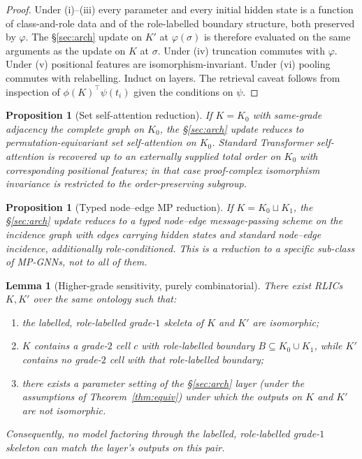 \documentclass[11pt]{article}
\theoremstyle{definition}
\theoremstyle{plain}
\newtheorem{lemma}[definition]{Lemma}
\newtheorem{proposition}[definition]{Proposition}
\begin{document}
\begin{proof}
Under (i)--(iii) every parameter and every initial hidden state is a function of class-and-role data and of the role-labelled boundary structure, both preserved by $\varphi$. The \S\ref{sec:arch} update on $K'$ at $\varphi(\sigma)$ is therefore evaluated on the same arguments as the update on $K$ at $\sigma$. Under (iv) truncation commutes with $\varphi$. Under (v) positional features are isomorphism-invariant. Under (vi) pooling commutes with relabelling. Induct on layers. The retrieval caveat follows from inspection of $\phi(K)^\top \psi(t_i)$ given the conditions on $\psi$.
\end{proof}

\begin{proposition}[Set self-attention reduction]\label{prop:set}
If $K = K_0$ with same-grade adjacency the complete graph on $K_0$, the \S\ref{sec:arch} update reduces to permutation-equivariant set self-attention on $K_0$. Standard Transformer self-attention is recovered up to an \emph{externally supplied} total order on $K_0$ with corresponding positional features; in that case proof-complex isomorphism invariance is restricted to the order-preserving subgroup.
\end{proposition}

\begin{proposition}[Typed node--edge MP reduction]\label{prop:nodeedge}
If $K = K_0 \sqcup K_1$, the \S\ref{sec:arch} update reduces to a typed node--edge message-passing scheme on the incidence graph with edges carrying hidden states and standard node--edge incidence, additionally role-conditioned. This is a reduction to a specific sub-class of MP-GNNs, not to all of them.
\end{proposition}

\begin{lemma}[Higher-grade sensitivity, purely combinatorial]\label{lem:sens}
There exist RLICs $K, K'$ over the same ontology such that:
\begin{enumerate}[label=(\alph*)]
\item the labelled, role-labelled grade-$1$ skeleta of $K$ and $K'$ are isomorphic;
\item $K$ contains a grade-$2$ cell $c$ with role-labelled boundary $B \subseteq K_0 \cup K_1$, while $K'$ contains no grade-$2$ cell with that role-labelled boundary;
\item there exists a parameter setting of the \S\ref{sec:arch} layer (under the assumptions of Theorem~\ref{thm:equiv}) under which the outputs on $K$ and $K'$ are not isomorphic.
\end{enumerate}
Consequently, no model factoring through the labelled, role-labelled grade-$1$ skeleton can match the layer's outputs on this pair.
\end{lemma}
\end{document}
